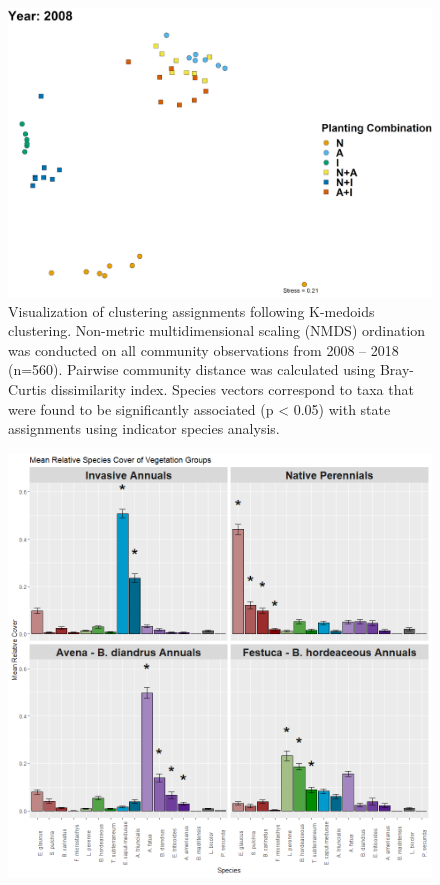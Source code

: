 \documentclass[twoside,12pt,final]{ucthesis-CA2012}
\begin{document}
\begin{ucmainmatter}
\begin{table}[ht]
\end{table}
\begin{figure}
\centering
\includegraphics[width=\textwidth,height=0.5\textheight]{figure/AppFig3_1.png}
\caption{Visualization of clustering assignments following K-medoids clustering. Non-metric multidimensional scaling (NMDS) ordination was conducted on all community observations from 2008 -- 2018 (n=560). Pairwise community distance was calculated using Bray-Curtis dissimilarity index. Species vectors correspond to taxa that were found to be significantly associated (p \textless{} 0.05) with state assignments using indicator species analysis. \label{app-3-1}}
\end{figure}
\begin{figure}
\centering
\includegraphics[width=\textwidth,height=0.8\textheight]{figure/AppFig3_2.png}

\end{figure}
\end{ucmainmatter}
\end{document}
